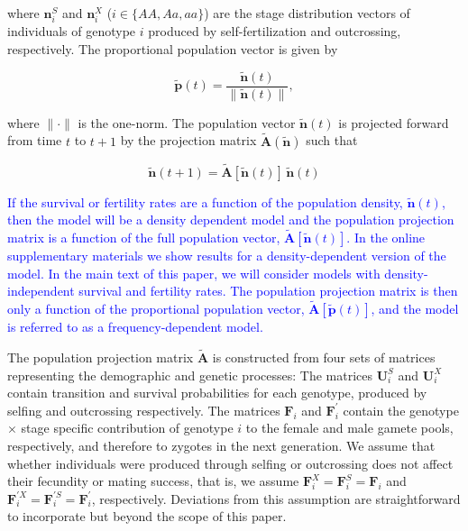 \documentclass[11pt]{article}
\def\mbf#1{\mathbf{#1}}
\begin{document}
\noindent where $\mbf{n}^{S}_{i}$ and $\mbf{n}^{X}_{i}$ ($i \in \{AA,Aa,aa\}$) are the stage distribution vectors of individuals of genotype $i$ produced by self-fertilization and outcrossing, respectively. The proportional population vector is given by
\begin{linenomath*}
\begin{equation} \label{eq:propPopVec}
	\tilde{\mbf{p}}(t) = \frac{\tilde{\mbf{n}}(t)}{ \| \tilde{\mbf{n}}(t) \|},
\end{equation}
\end{linenomath*}

\noindent where $\| \cdot \|$ is the one-norm. The population vector $\tilde{\mbf{n}}(t)$ is projected forward from time $t$ to $t + 1$ by the projection matrix $\tilde{\mbf{A}}(\tilde{\mbf{n}})$ such that 
\begin{linenomath*}
\begin{equation}
	\tilde{\mbf{n}}(t + 1) = \tilde{\mbf{A}}[\tilde{\mbf{n}}(t)] \, \tilde{\mbf{n}}(t)
\end{equation}
\end{linenomath*}
\textcolor{blue}{If the survival or fertility rates are a function of the population density, $\tilde{\mbf{n}}(t)$, then the model will be a density dependent model and the population projection matrix is a function of the full population vector, $\tilde{\mbf{A}}[\tilde{\mbf{n}}(t)]$. In the online supplementary materials we show results for a density-dependent version of the model. In the main text of this paper, we will consider models with density-independent survival and fertility rates. The population projection matrix is then only a function of the proportional population vector, $\tilde{\mbf{A}}[\tilde{\mbf{p}}(t)]$, and the model is referred to as a frequency-dependent model.}


The population projection matrix $\tilde{\mbf{A}}$ is constructed from four sets of matrices representing the demographic and genetic processes: The matrices $\mbf{U}^{S}_{i}$ and $\mbf{U}^{X}_{i}$ contain transition and survival probabilities for each genotype, produced by selfing and outcrossing respectively. The matrices $\mbf{F}_{i}$ and $\mbf{F}^{\prime}_{i}$ contain the genotype $\times$ stage specific contribution of genotype $i$ to the female and male gamete pools, respectively, and therefore to zygotes in the next generation. We assume that whether individuals were produced through selfing or outcrossing does not affect their fecundity or mating success, that is, we assume  $\mbf{F}^X_{i}=\mbf{F}^S_{i}=\mbf{F}_{i}$ and $\mbf{F}^{\prime X}_{i}=\mbf{F}^{\prime S}_{i}=\mbf{F}^{\prime}_{i}$, respectively. Deviations from this assumption are straightforward to incorporate but beyond the scope of this paper. 
\end{document}
